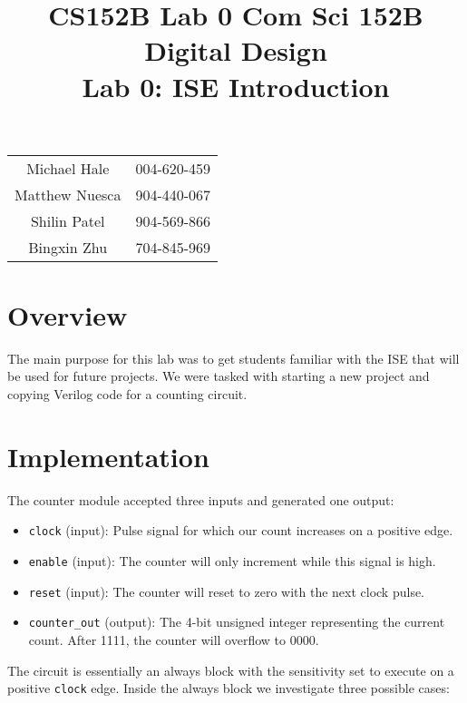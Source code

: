 \documentclass[11pt]{article}
\title{CS152B Lab 0}
\begin{document}
	
\title{\vspace{-0.5in} Com Sci 152B Digital Design \\
	Lab 0: ISE Introduction }
\date{}
\maketitle
\vspace{-0.75in}
\begin{center}
\begin{tabular}{cc}
	Michael Hale & 004-620-459 \\ 
	Matthew Nuesca & 904-440-067 \\ 
	Shilin Patel & 904-569-866 \\ 
	Bingxin Zhu & 704-845-969
\end{tabular}
\end{center}

\section*{Overview}
The main purpose for this lab was to get students familiar with the ISE that will be used for future projects. We were tasked with starting a new project and copying Verilog code for a counting circuit. 

\section*{Implementation}
The counter module accepted three inputs and generated one output:
\begin{itemize}
	\item \texttt{clock} (input): Pulse signal for which our count increases on a positive edge.
	
	\item \texttt{enable} (input): The counter will only increment while this signal is high.
	
	\item \texttt{reset} (input): The counter will reset to zero with the next clock pulse. 
	
	\item \texttt{counter\_out} (output): The 4-bit unsigned integer representing the current count. After 1111, the counter will overflow to 0000. 
\end{itemize}

The circuit is essentially an always block with the sensitivity set to execute on a positive \texttt{clock} edge. Inside the always block we investigate three possible cases:
\end{document}
